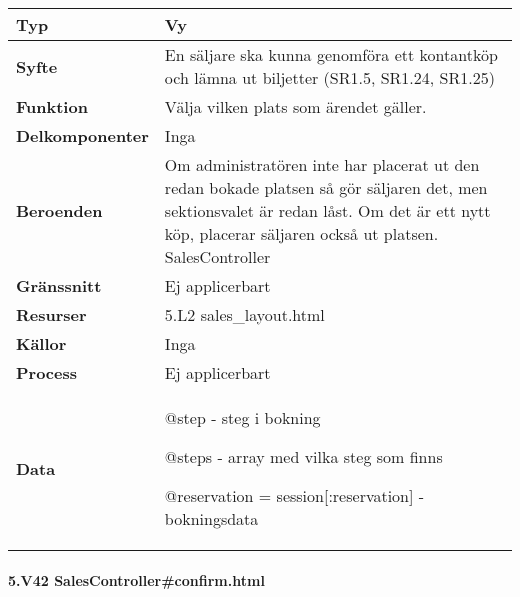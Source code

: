 \documentclass[a4paper, twoside, 11pt, titlepage]{article}
\begin{document}
			\begin {table} [ht] \begin{tabular} {  p{3.5cm} p{11.6cm} }
				\hline
				{\sffamily\textbf{Typ}} & {Vy} \\
				\hline
				{\sffamily\textbf{Syfte}} & {En säljare ska kunna genomföra ett kontantköp och lämna ut biljetter (SR1.5, SR1.24, SR1.25)} \\
				\hline
				{\sffamily\textbf{Funktion}} & {Välja vilken plats som ärendet gäller.} \\
				\hline
				{\sffamily\textbf{Delkomponenter}} & {Inga} \\
				\hline
				{\sffamily\textbf{Beroenden}} & {Om administratören inte har placerat ut den redan bokade platsen så gör säljaren det, men sektionsvalet är redan låst. Om det är ett nytt köp, placerar säljaren också ut platsen. SalesController} \\
				\hline
				{\sffamily\textbf{Gränssnitt}} & {Ej applicerbart} \\
				\hline
				{\sffamily\textbf{Resurser}} & {5.L2 sales\_layout.html} \\
				\hline
				{\sffamily\textbf{Källor}} & {Inga} \\
				\hline
				{\sffamily\textbf{Process}} & {Ej applicerbart} \\
				\hline
				{\sffamily\textbf{Data}} & {@step - steg i bokning

@steps - array med vilka steg som finns

@reservation = session[:reservation] - bokningsdata} \\
				\hline
			\end{tabular} \end{table} \FloatBarrier


			\clearpage %
			\paragraph{5.V42 SalesController\#confirm.html}\
\end{document}
